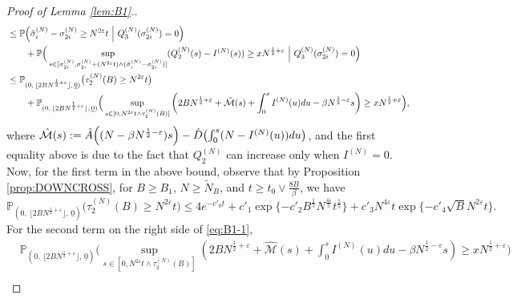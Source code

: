 \documentclass[11pt, reqno]{article}
\DeclarePairedDelimiter\autobracket{(}{)}
\newcommand{\br}[1]{\autobracket*{#1}}
\numberwithin{equation}{section}
\numberwithin{theorem}{section}
\begin{document}
\begin{appendix}
\begin{proof}[Proof of Lemma \ref{lem:B1}.]
\begin{equation}
\begin{split}
    &\leq \mathbb{P}\br{\hat{\sigma}^{(N)}_i-\sigma^{(N)}_{2i}\geq N^{2\varepsilon}t \ \Big|\ Q^{(N)}_3(\sigma^{(N)}_{2i})=0}\\
    & \qquad +\mathbb{P}\Big(\sup_{s\in[\sigma^{(N)}_{2i},\sigma^{(N)}_{2i} + (N^{2\varepsilon} t) \wedge (\hat{\sigma}^{(N)}_i-\sigma^{(N)}_{2i})]}(Q^{(N)}_2(s)-I^{(N)}(s))\geq xN^{\frac{1}{2}+\varepsilon}\ \Big|\ Q^{(N)}_3(\sigma^{(N)}_{2i})=0\Big)\\
    &\leq \mathbb{P}_{(0, \, \lfloor 2BN^{\frac{1}{2}+\varepsilon} \rfloor, \,\underline{0})}\big(\tau^{(N)}_2(B)\geq N^{2\varepsilon}t\big)\\
    &\qquad +\mathbb{P}_{(0, \, \lfloor 2BN^{\frac{1}{2}+\varepsilon} \rfloor, \,\underline{0})}\Big(\sup_{s\in[0,N^{2\varepsilon}t \wedge \tau_2^{(N)}(B)]}\left(2BN^{\frac{1}{2}+\varepsilon}+\hat{\mathcal{M}}(s)+\int_{0}^{s}I^{(N)}(u)du-\beta N^{\frac{1}{2}-\varepsilon}s\right) \geq xN^{\frac{1}{2}+\varepsilon} \Big),
    \end{split}
\end{equation}
 where $\hat{\mathcal{M}}(s) := \hat A\br{(N-\beta N^{\frac{1}{2}-\varepsilon})s} -  \hat D\br{\int_{0}^{s}(N-I^{(N)}(u))du}$, and the first equality above is due to the fact that $Q^{(N)}_2$ can increase only when $I^{(N)}=0$. 
Now, for the first term in the above bound, observe that by Proposition \ref{prop:DOWNCROSS}, for $B\geq B_1$, $N\geq \tilde N_B$, and $t\geq t_0\vee \frac{8B}{\beta}$, we have 
\begin{equation}\label{eq:Lemma4.12-1}
    \mathbb{P}_{(0, \, \lfloor 2BN^{\frac{1}{2}+\varepsilon} \rfloor, \,\underline{0})}\big(\tau^{(N)}_2(B)\geq N^{2\varepsilon}t\big)\leq 4e^{-c'_0t}+c'_1\exp \{-c'_2 B^{\frac{1}{5}}N^{\frac{4\varepsilon}{5}}t^{\frac{1}{5}}\}+c'_3N^{4\varepsilon}t\exp \{-c'_4\sqrt{B}N^{2\varepsilon}t\}.
\end{equation}
For the second term on the right side of \eqref{eq:B1-1},
\begin{align*}
    &\mathbb{P}_{(0, \, \lfloor 2BN^{\frac{1}{2}+\varepsilon} \rfloor, \,\underline{0})}\Big(\sup_{s\in[0,N^{2\varepsilon}t\wedge \tau_2^{(N)}(B)]}\left(2BN^{\frac{1}{2}+\varepsilon}+\hat{\mathcal{M}}(s)+\int_{0}^{s}I^{(N)}(u)du-\beta N^{\frac{1}{2}-\varepsilon}s\right) \geq xN^{\frac{1}{2}+\varepsilon}\Big)\\

\end{align*}
\end{proof}
\end{appendix}
\end{document}
